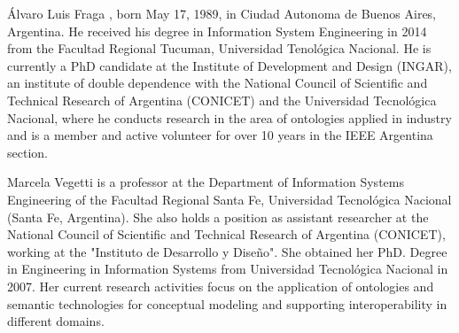 \documentclass[journal]{IEEEtran}
\begin{document}
\begin{IEEEbiography}{Álvaro Luis Fraga}
 , born May 17, 1989, in Ciudad Autonoma de Buenos Aires, Argentina. He received his degree in Information System Engineering in 2014 from the Facultad Regional Tucuman, Universidad Tenológica Nacional. He is currently a PhD candidate at the Institute of Development and Design (INGAR), an institute of double dependence with the National Council of Scientific and Technical Research of Argentina (CONICET) and the Universidad Tecnológica Nacional, where he conducts research in the area of ontologies applied in industry and is a member and active volunteer for over 10 years in the IEEE Argentina section.
\end{IEEEbiography}
\begin{IEEEbiography}{Marcela Vegetti}
 is a professor at the Department of Information Systems Engineering of the Facultad Regional Santa Fe, Universidad Tecnológica Nacional (Santa Fe, Argentina). She also holds a position as assistant researcher at the National Council of Scientific and Technical Research of Argentina (CONICET), working at the "Instituto de Desarrollo y Diseño". She obtained her PhD. Degree in Engineering in Information Systems from Universidad Tecnológica Nacional in 2007. Her current research activities focus on the application of ontologies and semantic technologies for conceptual modeling and supporting interoperability in different domains.
\end{IEEEbiography}

\end{document}
